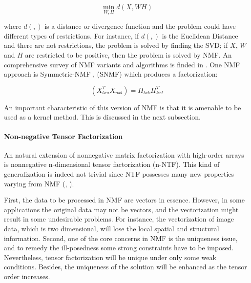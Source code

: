\documentclass[letterpaper,12pt]{article}
\begin{document}
\begin{equation}
\min_{W,H}d(X,WH)\label{eq:objective-function-factorization}
\end{equation}


where $d(,)$ is a distance or divergence function and the problem could have different types of restrictions. For instance, if $d(,)$
is the Euclidean Distance and there are not restrictions, the problem is solved by finding the SVD; if $X$, $W$ and $H$ are restricted
to be positive, then the problem is solved by NMF. An comprehensive survey of NMF variants and algorithms is finded in \cite{Wang2013}.
One NMF approach is Symmetric-NMF \cite{Ding2005}, (SNMF) which produces a factorization: 

\begin{equation}
(X_{lxn}^{T}X_{nxl})=H_{lxk}H_{kxl}^{T}\label{eq:symmetric-nmf}
\end{equation}

An important characteristic of this version of NMF is that it is amenable to be used as a kernel method. This is discussed in the next subsection.

\paragraph{Non-negative Tensor Factorization}%


An natural extension of nonnegative matrix factorization with high-order arrays is nonnegative n-dimensional tensor factorization (n-NTF). This kind of generalization is indeed not trivial since NTF possesses many new properties varying from NMF (\cite{Hazan2005}, \cite{Morup2008}).  

First, the data to be processed in NMF are vectors in essence. However, in some applications the original data may not be vectors, and the vectorization might result in some undesirable problems. For instance, the vectorization of image data, which is two dimensional, will lose the local spatial and structural information. Second, one of the core concerns in NMF is the uniqueness issue, and to remedy the ill-posedness some strong constraints have to be imposed. Nevertheless, tensor factorization will be unique under only some weak conditions. Besides, the uniqueness of the solution will be enhanced as the tensor order increases\cite{Wang2013}.
\end{document}
